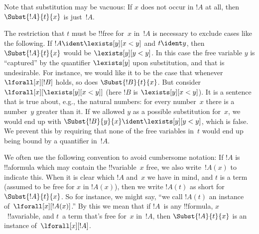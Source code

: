 \begin{explain}
Note that substitution may be vacuous: If $x$ does not occur in $!A$
at all, then $\Subst{!A}{t}{x}$ is just~$!A$.

The restriction that $t$ must be !!{free for}~$x$ in~$!A$ is necessary to
exclude cases like the following. If $!A \ident \lexists[y][x < y]$
and $t \ident y$, then $\Subst{!A}{t}{x}$ would be $\lexists[y][y <
  y]$. In this case the free variable $y$ is ``captured'' by the
quantifier $\lexists[y]$ upon substitution, and that is undesirable.
For instance, we would like it to be the case that whenever
$\lforall[x][!B]$ holds, so does $\Subst{!B}{t}{x}$. But consider
$\lforall[x][\lexists[y][x < y]]$ (here $!B$ is $\lexists[y][x <
  y]$). It is a sentence that is true about, e.g., the natural numbers:
for every number~$x$ there is a number~$y$ greater than it. If we
allowed $y$ as a possible substitution for~$x$, we would end up with
$\Subst{!B}{y}{x} \ident \lexists[y][y < y]$, which is false. We
prevent this by requiring that none of the free variables in~$t$ would
end up being bound by a quantifier in~$!A$.
\end{explain}

We often use the following convention to avoid cumbersome notation: If
$!A$ is !!a{formula} which may contain the !!{variable}~$x$ free, we
also write~$!A(x)$ to indicate this. When it is clear which $!A$
and~$x$ we have in mind, and $t$ is a term (assumed to be free for $x$
in $!A(x)$), then we write $!A(t)$ as short for $\Subst{!A}{t}{x}$. So
for instance, we might say, ``we call $!A(t)$ an instance
of~$\lforall[x][!A(x)]$.'' By this we mean that if $!A$~is any
!!{formula}, $x$~!!a{variable}, and $t$~a term that's free for~$x$
in~$!A$, then $\Subst{!A}{t}{x}$ is an instance of~$\lforall[x][!A]$.



\OLEndChapterHook






